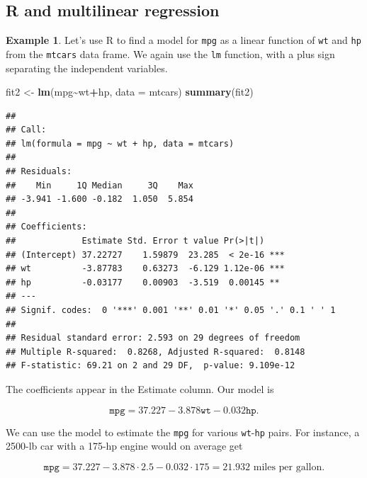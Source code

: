 \documentclass[
]{book}
\newenvironment{Shaded}{\begin{snugshade}}{\end{snugshade}}
\newcommand{\AttributeTok}[1]{\textcolor[rgb]{0.13,0.29,0.53}{#1}}
\newcommand{\FunctionTok}[1]{\textcolor[rgb]{0.13,0.29,0.53}{\textbf{#1}}}
\newcommand{\NormalTok}[1]{#1}
\newcommand{\OtherTok}[1]{\textcolor[rgb]{0.56,0.35,0.01}{#1}}
\newcommand{\SpecialCharTok}[1]{\textcolor[rgb]{0.81,0.36,0.00}{\textbf{#1}}}
\theoremstyle{definition}
\theoremstyle{definition}
\newtheorem{example}{Example}[chapter]
\theoremstyle{definition}
\theoremstyle{definition}
\theoremstyle{remark}
\begin{document}
\subsection*{R and multilinear regression}\label{r-and-multilinear-regression}

\begin{examplebox}

\begin{example}
Let's use R to find a model for \texttt{mpg} as a linear function of \texttt{wt} and \texttt{hp} from the \texttt{mtcars} data frame. We again use the \texttt{lm} function, with a plus sign separating the independent variables.

\begin{Shaded}
\begin{Highlighting}[]
\NormalTok{fit2 }\OtherTok{\textless{}{-}} \FunctionTok{lm}\NormalTok{(mpg}\SpecialCharTok{\textasciitilde{}}\NormalTok{wt}\SpecialCharTok{+}\NormalTok{hp, }\AttributeTok{data =}\NormalTok{ mtcars)}
\FunctionTok{summary}\NormalTok{(fit2)}
\end{Highlighting}
\end{Shaded}

\begin{verbatim}
## 
## Call:
## lm(formula = mpg ~ wt + hp, data = mtcars)
## 
## Residuals:
##    Min     1Q Median     3Q    Max 
## -3.941 -1.600 -0.182  1.050  5.854 
## 
## Coefficients:
##             Estimate Std. Error t value Pr(>|t|)    
## (Intercept) 37.22727    1.59879  23.285  < 2e-16 ***
## wt          -3.87783    0.63273  -6.129 1.12e-06 ***
## hp          -0.03177    0.00903  -3.519  0.00145 ** 
## ---
## Signif. codes:  0 '***' 0.001 '**' 0.01 '*' 0.05 '.' 0.1 ' ' 1
## 
## Residual standard error: 2.593 on 29 degrees of freedom
## Multiple R-squared:  0.8268, Adjusted R-squared:  0.8148 
## F-statistic: 69.21 on 2 and 29 DF,  p-value: 9.109e-12
\end{verbatim}

The coefficients appear in the Estimate column. Our model is

\[\texttt{mpg}=37.227-3.878\texttt{wt}-0.032\texttt{hp}.\]

We can use the model to estimate the \texttt{mpg} for various \texttt{wt}-\texttt{hp} pairs. For instance, a 2500-lb car with a 175-hp engine would on average get

\[\texttt{mpg}=37.227-3.878\cdot 2.5-0.032\cdot 175=21.932 \text{ miles per gallon}.\]


\end{example}
\end{examplebox}
\end{document}
